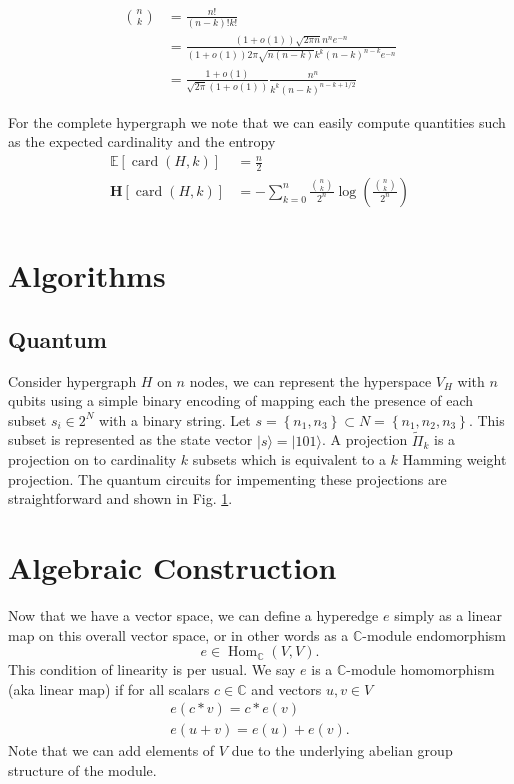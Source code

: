 \documentclass{article}
\newcommand{\ket}[1]{|#1\rangle}
\newcommand{\parens}[1]{\left( #1 \right)}
\newcommand{\brackets}[1]{\left[ #1 \right]}
\newcommand{\set}[1]{\left\{ #1 \right\}}
\newcommand{\expect}[1]{\mathbb{E}\brackets{#1}}
\newcommand{\field}{\mathbb{C}}
\DeclareMathOperator{\Hom}{Hom}
\DeclareMathOperator{\card}{card}
\newcommand{\cardi}[1]{\card \parens{ #1 }}
\newcommand{\fullProj}{\widetilde{\Pi}}
\begin{document}
\begin{align}
    \binom{n}{k} &= \frac{n!}{(n-k)! k!} \\
    &= \frac{(1 + o(1))\sqrt{2 \pi n} n^n e^{-n}}{(1+o(1)) 2 \pi \sqrt{n (n-k)} k^k (n-k)^{n-k} e^{-n}} \\
    &= \frac{1 + o(1)}{\sqrt{2 \pi}(1+o(1))} \frac{n^n}{ k^k (n-k)^{n-k + 1/2}}
\end{align}

For the complete hypergraph we note that we can easily compute quantities such as the expected cardinality and the entropy
\begin{align}
    \expect{\cardi{H, k}} &= \frac{n}{2} \\
    \mathbf{H} \brackets{\cardi{H, k}} &= - \sum_{k=0}^{n} \frac{\binom{n}{k}}{2^n} \log \parens{\frac{\binom{n}{k}}{2^n}}\\
\end{align}

\section{Algorithms} \label{sec:algorithms}
\subsection{Quantum}
Consider hypergraph $H$ on $n$ nodes, we can represent the hyperspace $V_H$ with $n$ qubits using a simple binary encoding of mapping each the presence of each subset $s_i \in 2^N$ with a binary string. Let $s = \set{n_1, n_3} \subset N = \set{n_1, n_2, n_3} $. This subset is represented as the state vector $\ket{s} = \ket{101}$. A projection $\fullProj_k$ is a projection on to cardinality $k$ subsets which is equivalent to a $k$ Hamming weight projection. The quantum circuits for impementing these projections are straightforward and shown in Fig. \ref{fig:projection_circuits}.



\begin{figure} \label{fig:projection_circuits}
    
\end{figure}

\section{Algebraic Construction}
Now that we have a vector space, we can define a hyperedge $e$ simply as a linear map on this overall vector space, or in other words as a $\field$-module endomorphism
\begin{equation}
    e \in \Hom_{\field} (V, V).
\end{equation}
This condition of linearity is per usual. We say $e$ is a $\field$-module homomorphism (aka linear map) if for all scalars $c \in \field$ and vectors $u, v \in V$
\begin{align}
    e(c * v) = c * e(v) \\
    e (u + v) = e(u) + e(v).
\end{align}
Note that we can add elements of $V$ due to the underlying abelian group structure of the module. 
\end{document}
